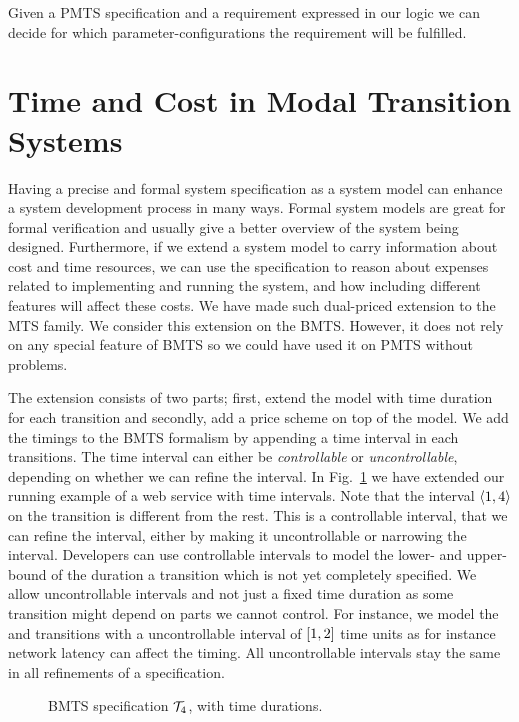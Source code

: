 \begin{result}
    Given a PMTS specification and a requirement expressed in our logic we can decide for which parameter-configurations the requirement will be fulfilled.
\end{result}

\section{Time and Cost in Modal Transition Systems}
Having a precise and formal system specification as a system model can enhance a system development process in many ways. Formal system models are great for formal verification and usually give a better overview of the system being designed. Furthermore, if we extend a system model to carry information about cost and time resources, we can use the specification to reason about expenses related to implementing and running the system, and how including different features will affect these costs. We have made such dual-priced extension to the MTS family. We consider this extension on the BMTS. However, it does not rely on any special feature of BMTS so we could have used it on PMTS without problems.

The extension consists of two parts; first, extend the model with time duration for each transition and  secondly, add a price scheme on top of the model. We add the timings to the BMTS formalism by appending a time interval in each transitions. The time interval can either be \emph{controllable} or \emph{uncontrollable}, depending on whether we can refine the interval. In Fig.~\ref{fig:duration-mts-file-service} we have extended our running example of a web service with time intervals. Note that the interval $\langle1,4\rangle$ on the  transition is different from the rest. This is a controllable interval, that we can refine the interval, either by making it uncontrollable or narrowing the interval. Developers can use controllable intervals to model the lower- and upper-bound of the duration a transition which is not yet completely specified. We allow uncontrollable intervals and not just a fixed time duration as some transition might depend on parts we cannot control. For instance, we model the  and  transitions with a uncontrollable interval of $[1,2]$ time units as for instance network latency can affect the timing. All uncontrollable intervals stay the same in all refinements of a specification.

\begin{figure}[ht]          
\centering
    
    \caption{BMTS specification $\mathcal{T}_4$, with time durations.}
    \label{fig:duration-mts-file-service}
\end{figure}

